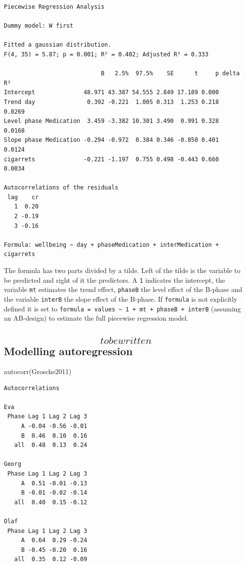 \documentclass[
  letterpaper,
  DIV=11,
  numbers=noendperiod]{scrreprt}
\newenvironment{Shaded}{\begin{snugshade}}{\end{snugshade}}
\newcommand{\FunctionTok}[1]{\textcolor[rgb]{0.28,0.35,0.67}{#1}}
\newcommand{\NormalTok}[1]{\textcolor[rgb]{0.00,0.23,0.31}{#1}}
\begin{document}
\begin{verbatim}
Piecewise Regression Analysis

Dummy model: W first

Fitted a gaussian distribution.
F(4, 35) = 5.87; p = 0.001; R² = 0.402; Adjusted R² = 0.333

                            B   2.5%  97.5%    SE      t     p delta R²
Intercept              48.971 43.387 54.555 2.849 17.189 0.000         
Trend day               0.392 -0.221  1.005 0.313  1.253 0.218   0.0269
Level phase Medication  3.459 -3.382 10.301 3.490  0.991 0.328   0.0168
Slope phase Medication -0.294 -0.972  0.384 0.346 -0.850 0.401   0.0124
cigarrets              -0.221 -1.197  0.755 0.498 -0.443 0.660   0.0034

Autocorrelations of the residuals
 lag    cr
   1  0.20
   2 -0.19
   3 -0.16

Formula: wellbeing ~ day + phaseMedication + interMedication + cigarrets
\end{verbatim}

The formula has two parts divided by a tilde. Left of the tilde is the
variable to be predicted and right of it the predictors. A \texttt{1}
indicates the intercept, the variable \texttt{mt} estimates the trend
effect, \texttt{phaseB} the level effect of the B-phase and the variable
\texttt{interB} the slope effect of the B-phase. If \texttt{formula} is
not explicitly defined it is set to
\texttt{formula\ =\ values\ \textasciitilde{}\ 1\ +\ mt\ +\ phaseB\ +\ interB}
(assuming an AB-design) to estimate the full piecewise regression model.

\hypertarget{to-be-written-modelling-autoregression}{%
\subsection{\texorpdfstring{\[to be written\] Modelling
autoregression}{to be written Modelling autoregression}}\label{to-be-written-modelling-autoregression}}

\begin{Shaded}
\begin{Highlighting}[]
\FunctionTok{autocorr}\NormalTok{(Grosche2011)}
\end{Highlighting}
\end{Shaded}

\begin{verbatim}
Autocorrelations

Eva 
 Phase Lag 1 Lag 2 Lag 3
     A -0.04 -0.56 -0.01
     B  0.46  0.10  0.16
   all  0.48  0.13  0.24

Georg 
 Phase Lag 1 Lag 2 Lag 3
     A  0.51 -0.01 -0.13
     B -0.01 -0.02 -0.14
   all  0.40  0.15 -0.12

Olaf 
 Phase Lag 1 Lag 2 Lag 3
     A  0.64  0.29 -0.24
     B -0.45 -0.20  0.16
   all  0.35  0.12 -0.09
\end{verbatim}
\end{document}
